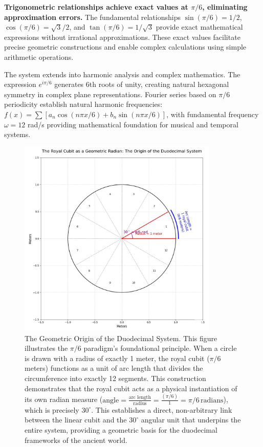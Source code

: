 \documentclass[11pt]{article}
\begin{document}
\textbf{Trigonometric relationships achieve exact values at $\pi/6$, eliminating approximation errors.} The fundamental relationships $\sin(\pi/6) = 1/2$, $\cos(\pi/6) = \sqrt{3}/2$, and $\tan(\pi/6) = 1/\sqrt{3}$ provide exact mathematical expressions without irrational approximations. These exact values facilitate precise geometric constructions and enable complex calculations using simple arithmetic operations.

The system extends into harmonic analysis and complex mathematics. The expression $e^{i\pi/6}$ generates 6th roots of unity, creating natural hexagonal symmetry in complex plane representations. Fourier series based on $\pi/6$ periodicity establish natural harmonic frequencies: $f(x) = \sum[a_n\cos(n\pi x/6) + b_n\sin(n\pi x/6)]$, with fundamental frequency $\omega = 12$ rad/s providing mathematical foundation for musical and temporal systems.

\begin{figure}[htbp]
\centering
\includegraphics[width=0.85\textwidth]{figures/radian-fig.jpeg}
\caption{The Geometric Origin of the Duodecimal System. This figure illustrates the $\pi/6$ paradigm's foundational principle. When a circle is drawn with a radius of exactly 1 meter, the royal cubit ($\pi/6$ meters) functions as a unit of arc length that divides the circumference into exactly 12 segments. This construction demonstrates that the royal cubit acts as a physical instantiation of its own radian measure ($\text{angle} = \frac{\text{arc length}}{\text{radius}} = \frac{(\pi/6)}{1} = \pi/6\,\text{radians}$), which is precisely $30^\circ$. This establishes a direct, non-arbitrary link between the linear cubit and the $30^\circ$ angular unit that underpins the entire system, providing a geometric basis for the duodecimal frameworks of the ancient world.}
\label{fig:radian_origin}
\end{figure}
\end{document}
